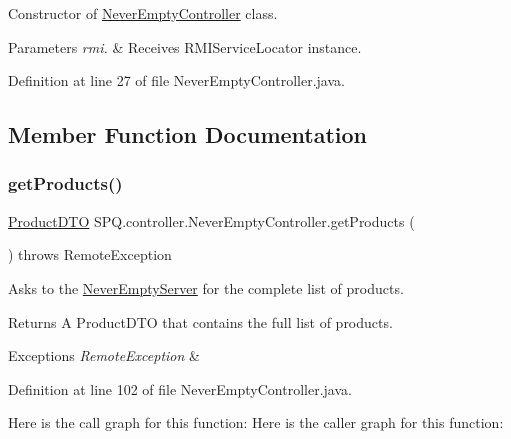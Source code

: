 Constructor of \mbox{\hyperlink{class_s_p_q_1_1controller_1_1_never_empty_controller}{Never\+Empty\+Controller}} class. 
\begin{DoxyParams}{Parameters}
{\em rmi.} & Receives R\+M\+I\+Service\+Locator instance. \\
\hline
\end{DoxyParams}


Definition at line 27 of file Never\+Empty\+Controller.\+java.



\subsection{Member Function Documentation}
\mbox{\label{class_s_p_q_1_1controller_1_1_never_empty_controller_ace99d4d39979b72d620871475a4817f9}} 
\subsubsection{\texorpdfstring{get\+Products()}{getProducts()}}
{\footnotesize\ttfamily \mbox{\hyperlink{class_s_p_q_1_1dto_1_1_product_d_t_o}{Product\+D\+TO}} S\+P\+Q.\+controller.\+Never\+Empty\+Controller.\+get\+Products (\begin{DoxyParamCaption}{ }\end{DoxyParamCaption}) throws Remote\+Exception}

Asks to the \mbox{\hyperlink{class_s_p_q_1_1_never_empty_server}{Never\+Empty\+Server}} for the complete list of products. \begin{DoxyReturn}{Returns}
A Product\+D\+TO that contains the full list of products. 
\end{DoxyReturn}

\begin{DoxyExceptions}{Exceptions}
{\em Remote\+Exception} & \\
\hline
\end{DoxyExceptions}


Definition at line 102 of file Never\+Empty\+Controller.\+java.

Here is the call graph for this function\+:
Here is the caller graph for this function\+:
\mbox{\label{class_s_p_q_1_1controller_1_1_never_empty_controller_a4f799c7fc9ce32740ec45401fa6fd1b1}} 

